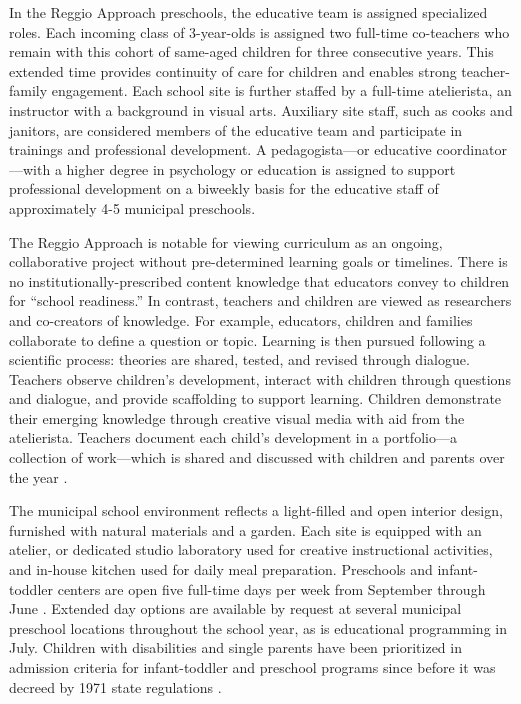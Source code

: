 In the Reggio Approach preschools, the educative team is assigned specialized roles. Each incoming class of 3-year-olds is assigned two full-time co-teachers who remain with this cohort of same-aged children for three consecutive years. This extended time provides continuity of care for children and enables strong teacher-family engagement. Each school site is further staffed by a full-time atelierista, an instructor with a background in visual arts. Auxiliary site staff, such as cooks and janitors, are considered members of the educative team and participate in trainings and professional development. A pedagogista---or educative coordinator---with a higher degree in psychology or education is assigned to support professional development on a biweekly basis for the educative staff of approximately 4-5 municipal preschools. 

The Reggio Approach is notable for viewing curriculum as an ongoing, collaborative project without pre-determined learning goals or timelines. There is no institutionally-prescribed content knowledge that educators convey to children for ``school readiness.'' In contrast, teachers and children are viewed as researchers and co-creators of knowledge. For example, educators, children and families collaborate to define a question or topic. Learning is then pursued following a scientific process: theories are shared, tested, and revised through dialogue. Teachers observe children's development, interact with children through questions and dialogue, and provide scaffolding to support learning. Children demonstrate their emerging knowledge through creative visual media with aid from the atelierista. Teachers document each child's development in a portfolio---a collection of work---which is shared and discussed with children and parents over the year \citep{Rinaldi_2006_ReggioEmilia_BOOK,Giudici-Nicolosi_2014_Reggio-Approach}. 

The municipal school environment reflects a light-filled and open interior design, furnished with natural materials and a garden. Each site is equipped with an atelier, or dedicated studio laboratory used for creative instructional activities, and in-house kitchen used for daily meal preparation. Preschools and infant-toddler centers are open five full-time days per week from September through June \citep{Giudici-Nicolosi_2014_Reggio-Approach}. Extended day options are available by request at several municipal preschool locations throughout the school year, as is educational programming in July. Children with disabilities and single parents have been prioritized in admission criteria for infant-toddler and preschool programs since before it was decreed by 1971 state regulations \citep{Edwards-etal-eds_1998_Hundred-Languages}.

